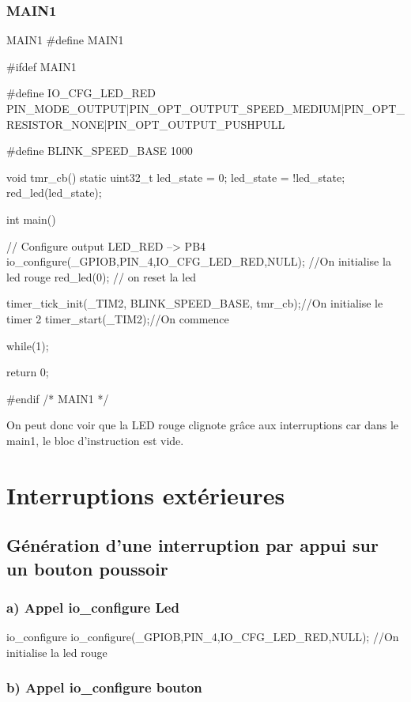 {\subsection{MAIN1}

\begin{Cpp}{MAIN1} 
#define MAIN1

#ifdef MAIN1

#define IO_CFG_LED_RED  PIN_MODE_OUTPUT|PIN_OPT_OUTPUT_SPEED_MEDIUM|PIN_OPT_RESISTOR_NONE|PIN_OPT_OUTPUT_PUSHPULL

#define BLINK_SPEED_BASE    1000

void tmr_cb()
{
    static uint32_t led_state = 0;
    led_state = !led_state;
	red_led(led_state);
}

int main()
{
    // Configure output LED_RED   --> PB4
	io_configure(_GPIOB,PIN_4,IO_CFG_LED_RED,NULL); //On initialise la led rouge
    red_led(0); // on reset la led

	timer_tick_init(_TIM2, BLINK_SPEED_BASE, tmr_cb);//On initialise le timer 2
	timer_start(_TIM2);//On commence 
	
	while(1){;}
    
	return 0;
}

#endif /* MAIN1 */
\end{Cpp}

On peut donc voir que la LED rouge clignote grâce aux interruptions car dans le main1, le bloc d'instruction  est vide.



\chapter{Interruptions extérieures}


\section{Génération d'une interruption par appui sur un bouton poussoir}

\subsection{a) Appel io\_configure Led}

\begin{Cpp}{io\_configure} 
io_configure(_GPIOB,PIN_4,IO_CFG_LED_RED,NULL); //On initialise la led rouge
\end{Cpp}

\subsection{b) Appel io\_configure bouton}

}
